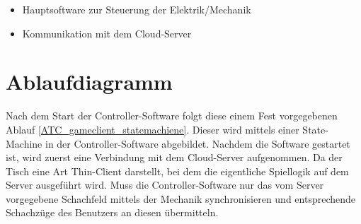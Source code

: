 \begin{itemize}
\tightlist
\item
  Hauptsoftware zur Steuerung der Elektrik/Mechanik
\item
  Kommunikation mit dem Cloud-Server
\end{itemize}

\hypertarget{ablaufdiagramm}{%
\section{Ablaufdiagramm}\label{ablaufdiagramm}}

Nach dem Start der Controller-Software folgt diese einem Fest
vorgegebenen Ablauf \ref{ATC_gameclient_statemachiene}. Dieser wird
mittels einer State-Machine in der Controller-Software abgebildet.
Nachdem die Software gestartet ist, wird zuerst eine Verbindung mit dem
Cloud-Server aufgenommen. Da der Tisch eine Art Thin-Client darstellt,
bei dem die eigentliche Spiellogik auf dem Server ausgeführt wird. Muss
die Controller-Software nur das vom Server vorgegebene Schachfeld
mittels der Mechanik synchronisieren und entsprechende Schachzüge des
Benutzers an diesen übermitteln.

